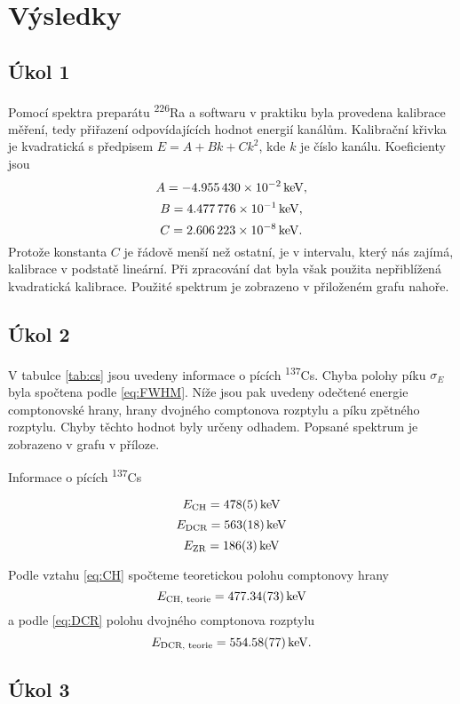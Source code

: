 \documentclass{protokol}
\begin{document}
    
  \section*{Výsledky}

    \subsection*{Úkol 1}

      Pomocí spektra preparátu \textsuperscript{226}Ra a softwaru v praktiku byla provedena kalibrace měření, tedy přiřazení odpovídajících hodnot energií kanálům. Kalibrační křivka je kvadratická s předpisem $E = A + B k + C k^2$, kde $k$ je číslo kanálu. Koeficienty jsou 
      $$ A = \SI{-4.955430E-002}{keV}, $$
      $$ B = \SI{4.477776E-001}{keV}, $$
      $$ C = \SI{2.606223E-008}{keV}. $$
      Protože konstanta $C$ je řádově menší než ostatní, je v intervalu, který nás zajímá, kalibrace v podstatě lineární. Při zpracování dat byla však použita nepřiblížená kvadratická kalibrace. Použité spektrum je zobrazeno v přiloženém grafu nahoře.
  
    \subsection*{Úkol 2}

      V tabulce \ref{tab:cs} jsou uvedeny informace o pících \textsuperscript{137}Cs. Chyba polohy píku $\sigma_E$ byla spočtena podle \eqref{eq:FWHM}. Níže jsou pak uvedeny odečtené energie comptonovské hrany, hrany dvojného comptonova rozptylu a píku zpětného rozptylu. Chyby těchto hodnot byly určeny odhadem. Popsané spektrum je zobrazeno v grafu v příloze.

      \begin{table}[H]
        \centering
        \setlength{\tabcolsep}{10pt}
        
        \caption{Informace o pících \textsuperscript{137}Cs} 
        \label{tab:cs}
      \end{table}

      $$ E_\text{CH} = \SI{478 \pm 5}{keV} $$
      $$ E_\text{DCR} = \SI{563 \pm 18}{keV} $$
      $$ E_\text{ZR} = \SI{186 \pm 3}{keV} $$

      Podle vztahu \eqref{eq:CH} spočteme teoretickou polohu comptonovy hrany
      $$ E_\text{CH, teorie} = \SI{477.34 \pm 0.73}{keV} $$
      a podle \eqref{eq:DCR} polohu dvojného comptonova rozptylu
      $$ E_\text{DCR, teorie} = \SI{554.58 \pm 0.77}{keV}. $$

    \subsection*{Úkol 3}
\end{document}
